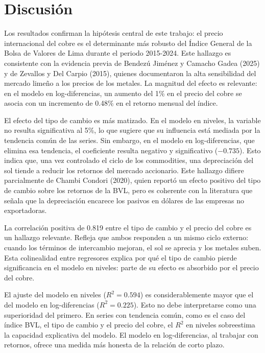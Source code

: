 \documentclass[12pt, a4paper]{article}
\begin{document}
\section{Discusión}

Los resultados confirman la hipótesis central de este trabajo: el precio internacional del cobre es el determinante más robusto del Índice General de la Bolsa de Valores de Lima durante el periodo 2015-2024. Este hallazgo es consistente con la evidencia previa de Bendezú Jiménez y Camacho Gadea (2025) y de Zevallos y Del Carpio (2015), quienes documentaron la alta sensibilidad del mercado limeño a los precios de los metales. La magnitud del efecto es relevante: en el modelo en log-diferencias, un aumento del 1\% en el precio del cobre se asocia con un incremento de 0.48\% en el retorno mensual del índice.

El efecto del tipo de cambio es más matizado. En el modelo en niveles, la variable no resulta significativa al 5\%, lo que sugiere que su influencia está mediada por la tendencia común de las series. Sin embargo, en el modelo en log-diferencias, que elimina esa tendencia, el coeficiente resulta negativo y significativo ($-0.735$). Esto indica que, una vez controlado el ciclo de los commodities, una depreciación del sol tiende a reducir los retornos del mercado accionario. Este hallazgo difiere parcialmente de Chambi Condori (2020), quien reportó un efecto positivo del tipo de cambio sobre los retornos de la BVL, pero es coherente con la literatura que señala que la depreciación encarece los pasivos en dólares de las empresas no exportadoras.

La correlación positiva de 0.819 entre el tipo de cambio y el precio del cobre es un hallazgo relevante. Refleja que ambos responden a un mismo ciclo externo: cuando los términos de intercambio mejoran, el sol se aprecia y los metales suben. Esta colinealidad entre regresores explica por qué el tipo de cambio pierde significancia en el modelo en niveles: parte de su efecto es absorbido por el precio del cobre.

El ajuste del modelo en niveles ($R^2 = 0.594$) es considerablemente mayor que el del modelo en log-diferencias ($R^2 = 0.225$). Esto no debe interpretarse como una superioridad del primero. En series con tendencia común, como es el caso del índice BVL, el tipo de cambio y el precio del cobre, el $R^2$ en niveles sobreestima la capacidad explicativa del modelo. El modelo en log-diferencias, al trabajar con retornos, ofrece una medida más honesta de la relación de corto plazo.
\end{document}
